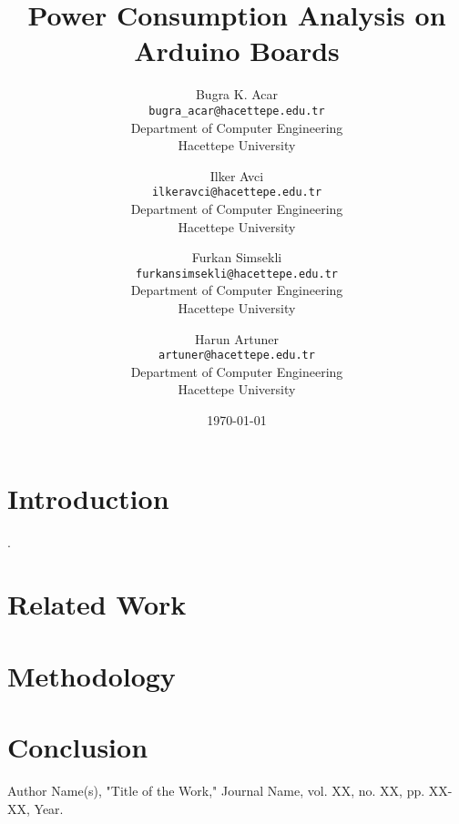 \documentclass[12pt]{article}
\title{Power Consumption Analysis on Arduino Boards}
\author{
    Bugra K. Acar \\ 
    \small \texttt{bugra\_acar@hacettepe.edu.tr} \\ 
    \small Department of Computer Engineering \\ 
    \small Hacettepe University \\
    \and
    Ilker Avci \\ 
    \small \texttt{ilkeravci@hacettepe.edu.tr} \\ 
    \small Department of Computer Engineering \\ 
    \small Hacettepe University \\
    \and
    Furkan Simsekli \\ 
    \small \texttt{furkansimsekli@hacettepe.edu.tr} \\ 
    \small \small Department of Computer Engineering \\ 
    \small Hacettepe University \\
    \and
    Harun Artuner \\ 
    \small \texttt{artuner@hacettepe.edu.tr} \\ 
    \small Department of Computer Engineering \\ 
    \small Hacettepe University \\
}
\date{\today}
\begin{document}
\maketitle

\begin{abstract}
\lipsum[1]
\end{abstract}

\section{Introduction}
\lipsum[2]\cite{example_reference}.


\section{Related Work}
\lipsum[3]

\section{Methodology}
\lipsum[4]

\section{Conclusion}
\lipsum[5]

\begin{thebibliography}{99}

Author Name(s), "Title of the Work," Journal Name, vol. XX, no. XX, pp. XX-XX, Year.

\end{thebibliography}
\end{document}
